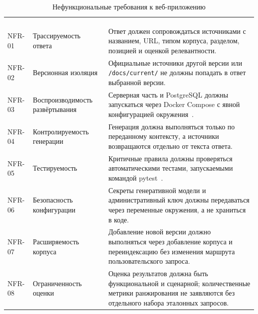 \begingroup
\centering
\small
{}\selectfont
\setlength{\tabcolsep}{3pt}
\begin{longtable}{|P{0.10\textwidth}|P{0.28\textwidth}|P{0.52\textwidth}|}
\caption{Нефункциональные требования к веб-приложению}\label{tab:analysis-nfr}\\
\hline
{} &  &  \\ \hline
{} &  &  \\ \hline
\endfirsthead
{}\\
\hline
{} &  &  \\ \hline
\endhead
\endfoot
NFR-01 & Трассируемость ответа & Ответ должен сопровождаться источниками с названием, URL, типом корпуса, разделом, позицией и оценкой релевантности. \\ \hline
NFR-02 & Версионная изоляция & Официальные источники другой версии или \texttt{/docs/current/} не должны попадать в ответ выбранной версии. \\ \hline
NFR-03 & Воспроизводимость развёртывания & Серверная часть и PostgreSQL должны запускаться через Docker Compose с явной конфигурацией окружения~\cite{docker-docs}. \\ \hline
NFR-04 & Контролируемость генерации & Генерация должна выполняться только по переданному контексту, а источники возвращаются отдельно от текста ответа. \\ \hline
NFR-05 & Тестируемость & Критичные правила должны проверяться автоматическими тестами, запускаемыми командой pytest~\cite{pytest-docs,beizer1990,myers2011}. \\ \hline
NFR-06 & Безопасность конфигурации & Секреты генеративной модели и административный ключ должны передаваться через переменные окружения, а не храниться в коде. \\ \hline
NFR-07 & Расширяемость корпуса & Добавление новой версии должно выполняться через добавление корпуса и переиндексацию без изменения маршрута пользовательского запроса. \\ \hline
NFR-08 & Ограниченность оценки & Оценка результатов должна быть функциональной и сценарной; количественные метрики ранжирования не заявляются без отдельного набора эталонных запросов. \\ \hline
\end{longtable}
\par\endgroup

